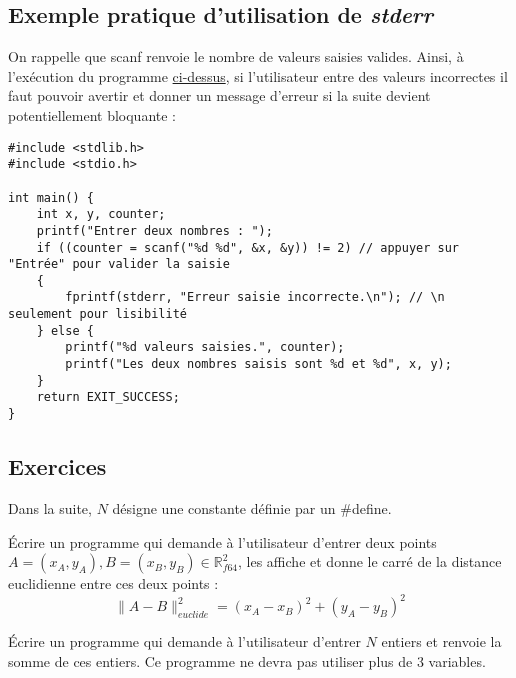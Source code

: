 \documentclass[../../../main.tex]{subfiles}
\begin{document}
\subsection{Exemple pratique d'utilisation de \textit{stderr}}
\label{sub:exemple_pratique_d_utilisation_de_stderr}
On rappelle que \textsf{scanf} renvoie le nombre de valeurs saisies valides. Ainsi, à l'exécution du programme \hyperref[lst:prgm1]{ci-dessus}{}, si l'utilisateur entre des valeurs incorrectes il faut pouvoir avertir et donner un message d'erreur si la suite devient potentiellement bloquante :
	\begin{verbatim}
#include <stdlib.h>
#include <stdio.h>

int main() {
	int x, y, counter;
	printf("Entrer deux nombres : ");
	if ((counter = scanf("%d %d", &x, &y)) != 2) // appuyer sur "Entrée" pour valider la saisie
	{
		fprintf(stderr, "Erreur saisie incorrecte.\n"); // \n seulement pour lisibilité
	} else {
		printf("%d valeurs saisies.", counter);
		printf("Les deux nombres saisis sont %d et %d", x, y);
	}
	return EXIT_SUCCESS;
}
	\end{verbatim}
\subsection{Exercices}
Dans la suite, $N$ désigne une constante définie par un \textsf{\#define}.

Écrire un programme qui demande à l'utilisateur d'entrer deux points $A = (x_{A}, y_{A}), B = (x_{B}, y_{B})\in{\mathbb{R}_{f64}^{2}}$, les affiche et donne le carré de la distance euclidienne entre ces deux points :
$$\lVert{A - B}\rVert^{2}_{euclide} = (x_{A} - x_{B})^{2} + (y_{A} - y_{B})^{2}$$

Écrire un programme qui demande à l'utilisateur d'entrer $N$ entiers et renvoie la somme de ces entiers. Ce programme ne devra pas utiliser plus de 3 variables.
\end{document}
